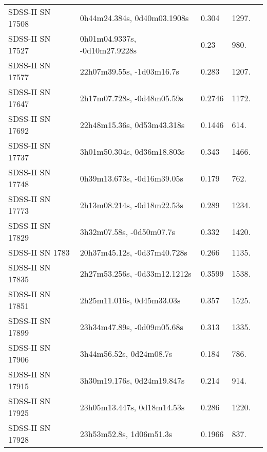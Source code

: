 \begin{longtable}{lllll}
 SDSS-II SN 17508 &    0h44m24.384s, 0d40m03.1908s &    0.304 &          1297. &    \citet{2011ApJ...738..162S} \\
 SDSS-II SN 17527 &  0h01m04.9337s, -0d10m27.9228s &     0.23 &           980. &    \citet{2011ApJ...738..162S} \\
 SDSS-II SN 17577 &      22h07m39.55s, -1d03m16.7s &    0.283 &          1207. &    \citet{2010ApJ...713.1026D} \\
 SDSS-II SN 17647 &     2h17m07.728s, -0d48m05.59s &   0.2746 &          1172. &    \citet{2016SDSSD.C...0000:} \\
 SDSS-II SN 17692 &     22h48m15.36s, 0d53m43.318s &   0.1446 &           614. &    \citet{2004SDSS2.C...0000:} \\
 SDSS-II SN 17737 &     3h01m50.304s, 0d36m18.803s &    0.343 &          1466. &    \citet{2011ApJ...738..162S} \\
 SDSS-II SN 17748 &     0h39m13.673s, -0d16m39.05s &    0.179 &           762. &    \citet{2010ApJ...713.1026D} \\
 SDSS-II SN 17773 &     2h13m08.214s, -0d18m22.53s &    0.289 &          1234. &    \citet{2011ApJ...738..162S} \\
 SDSS-II SN 17829 &       3h32m07.58s, -0d50m07.7s &    0.332 &          1420. &    \citet{2010ApJ...713.1026D} \\
  SDSS-II SN 1783 &    20h37m45.12s, -0d37m40.728s &    0.266 &          1135. &    \citet{2011ApJ...738..162S} \\
 SDSS-II SN 17835 &   2h27m53.256s, -0d33m12.1212s &   0.3599 &          1538. &    \citet{2016SDSSD.C...0000:} \\
 SDSS-II SN 17851 &      2h25m11.016s, 0d45m33.03s &    0.357 &          1525. &    \citet{2005ApJS..158..161H} \\
 SDSS-II SN 17899 &     23h34m47.89s, -0d09m05.68s &    0.313 &          1335. &    \citet{2011ApJ...738..162S} \\
 SDSS-II SN 17906 &        3h44m56.52s, 0d24m08.7s &    0.184 &           786. &    \citet{2010ApJ...713.1026D} \\
 SDSS-II SN 17915 &     3h30m19.176s, 0d24m19.847s &    0.214 &           914. &    \citet{2011ApJ...738..162S} \\
 SDSS-II SN 17925 &     23h05m13.447s, 0d18m14.53s &    0.286 &          1220. &    \citet{2010ApJ...713.1026D} \\
 SDSS-II SN 17928 &        23h53m52.8s, 1d06m51.3s &   0.1966 &           837. &    \citet{2011ApJ...738..162S} \\

\end{longtable}
